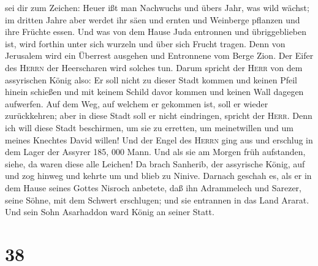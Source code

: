sei dir zum Zeichen: Heuer ißt man Nachwuchs und übers Jahr, was wild
wächst; im dritten Jahre aber werdet ihr säen und ernten und Weinberge
pflanzen und ihre Früchte essen.  Und was von dem Hause
Juda entronnen und übriggeblieben ist, wird forthin unter sich wurzeln
und über sich Frucht tragen.  Denn von Jerusalem wird ein
Überrest ausgehen und Entronnene vom Berge Zion. Der Eifer des
\textsc{Herrn} der Heerscharen wird solches tun.  Darum
spricht der \textsc{Herr} von dem assyrischen König also: Er soll nicht
zu dieser Stadt kommen und keinen Pfeil hinein schießen und mit keinem
Schild davor kommen und keinen Wall dagegen aufwerfen. 
Auf dem Weg, auf welchem er gekommen ist, soll er wieder zurückkehren;
aber in diese Stadt soll er nicht eindringen, spricht der \textsc{Herr}.
 Denn ich will diese Stadt beschirmen, um sie zu
erretten, um meinetwillen und um meines Knechtes David willen!
 Und der Engel des \textsc{Herrn} ging aus und erschlug
in dem Lager der Assyrer 185, 000 Mann. Und als sie am Morgen früh
aufstanden, siehe, da waren diese alle Leichen!  Da brach
Sanherib, der assyrische König, auf und zog hinweg und kehrte um und
blieb zu Ninive.  Darnach geschah es, als er in dem Hause
seines Gottes Nisroch anbetete, daß ihn Adrammelech und Sarezer, seine
Söhne, mit dem Schwert erschlugen; und sie entrannen in das Land Ararat.
Und sein Sohn Asarhaddon ward König an seiner Statt.

\hypertarget{section-37}{%
\section{38}\label{section-37}}

